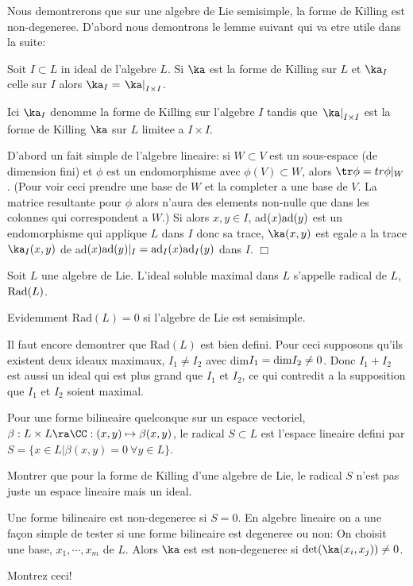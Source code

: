 Nous demontrerons que sur une algebre de Lie  semisimple, la forme de Killing est non-degeneree.
 D'abord nous demontrons le lemme suivant qui va etre utile dans la suite:
\begin{lem}\label{l1:ka} Soit $I\subset L$ in ideal de l'algebre $L$. Si $\ka$ est la forme de Killing sur $L$ et $\ka_I$ 
celle sur $I$ alors $\ka_I = \left.\ka\right|_{I\times I}$.
\end{lem}
Ici $\ka_I$ denomme la forme de Killing sur l'algebre $I$ tandis que $ \left.\ka\right|_{I\times I}$ 
est la forme de Killing $\ka$ sur $L$ limitee a $I\times I$.
\begin{prv} D'abord un fait simple de l'algebre lineaire: si $W\subset V$ est un sous-espace (de dimension fini) 
et $\phi$ est un endomorphisme avec $\phi(V) \subset W$, alors $\tr\phi = tr\phi|_W$. (Pour voir ceci prendre une base de $W$ et la completer a une base de $V$. La matrice resultante pour $\phi$ alors n'aura des elements non-nulle
 que dans les colonnes qui correspondent a $W$.) Si alors $x,y\in I$,
 ad$(x){\rm ad}(y)$ est un endomorphisme qui applique $L$ dans $I$ donc sa trace, $\ka(x,y)$ 
 est egale a la trace $\ka_I(x,y)$ de ad$(x){\rm ad}(y)|_I =  {\rm ad}_I(x){\rm ad}_I(y)$ dans $I$.
 \hfill $\Box$
\end{prv}
\begin{ddd} Soit $L$ une algebre de Lie. L'ideal soluble maximal dans $L$ s'appelle radical de $L$, ${\rm Rad}(L)$.
\end{ddd}
Evidemment Rad$(L) =0$ si l'algebre de Lie est  semisimple.

Il faut encore demontrer que Rad$(L)$ est bien defini. Pour ceci supposons qu'ils existent deux ideaux maximaux,
$I_1 \neq I_2$ avec dim$I_1={\rm dim} I_2 \neq 0$. Donc $I_1+I_2$ est aussi un ideal qui est plus grand 
que $I_1$ et $I_2$, ce qui contredit a la supposition que $I_1$ et $I_2$ soient maximal.

Pour une forme bilineaire quelconque sur un espace vectoriel, $\beta :L\times L \ra \CC : (x,y)\mapsto \beta(x,y)$,
le radical $S\subset L$ est l'espace lineaire defini par $S =\{x\in L| \beta(x,y)=0~\forall y\in L\}$. 
\begin{eee} Montrer que pour la forme de
Killing d'une algebre de Lie, le radical $S$ n'est pas juste un espace lineaire mais un ideal. 
\end{eee}
Une forme bilineaire est non-degeneree si $S=0$. En algebre lineaire on a une fa\c{c}on simple de
tester si une forme bilineaire est degeneree ou non: On choisit une base, $x_1,\cdots, x_m$ de $L$.
Alors $\ka$ est est non-degeneree si $\det(\ka(x_i,x_j))\neq 0$.
\begin{eee} Montrez ceci! \end{eee}

